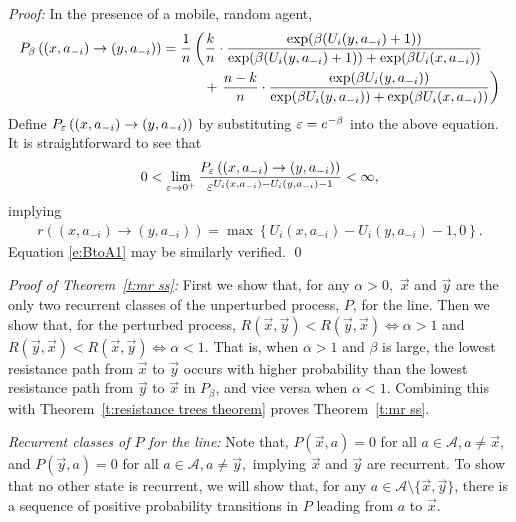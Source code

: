 \noindent\emph{Proof:}
In the presence of a mobile, random agent, %
\begin{align*}
P_\beta \left((x,a_{-i})\to (y,a_{-i})\right) 
&= {1\over n} \left({k\over n}\cdot{\exp( \beta(U_i(y,a_{-i})+1))\over \exp( \beta (U_i(y,a_{-i})+1)) + \exp( \beta U_i(x,a_{-i}))}\right.\\
&\quad\quad\quad + \left.{n-k\over n}\cdot{\exp( \beta U_i(y,a_{-i}))\over \exp( \beta U_i(y,a_{-i})) + \exp( \beta U_i(x,a_{-i}))}\right)
\end{align*}
Define $P_\varepsilon\left((x,a_{-i})\to (y,a_{-i})\right)$ by substituting $\varepsilon = e^{-\beta}$ into the above equation. It is straightforward to see that
\begin{equation*}
0<\lim_{\varepsilon\to 0^+}{P_{\varepsilon} \left((x,a_{-i})\to (y,a_{-i})\right)\over \varepsilon^{  U_i(x,a_{-i}) - U_i(y,a_{-i}) -1 }}<\infty,
\end{equation*}
implying 
\begin{align*}
r((x,a_{-i})\to (y,a_{-i}) )=  \max\left\{U_i(x,a_{-i}) - U_i(y,a_{-i}) -1,0\right\}.
\end{align*}
Equation \eqref{e:BtoA1} may be similarly verified.
\hfill\qed



\noindent\emph{Proof of Theorem~\ref{t:mr ss}: }\label{a:proof mr ss}
First we show that, for any $\alpha >0,$ $\vec{x}$ and $ \vec{y}$ are the only two recurrent classes of the unperturbed process, $P$, for the line. Then we show that, for the perturbed process, 
$R(\vec{x}, \vec{y}) < R( \vec{y},\vec{x}) \iff \alpha >1$ 
and 
$R( \vec{y},\vec{x}) < R(\vec{x}, \vec{y}) \iff \alpha <1.$
That is, when $\alpha >1$ and $\beta$ is large, the lowest resistance path from $\vec{x}$ to $ \vec{y}$ occurs with higher probability than the lowest resistance path from $ \vec{y}$ to $\vec{x}$ in $P_\beta$, and vice versa when $\alpha <1.$ 
 Combining this with Theorem~\ref{t:resistance trees theorem} proves Theorem~\ref{t:mr ss}.

\noindent\emph{Recurrent classes of $P$ for the line:} Note that, 
$P(\vec{x},a) = 0$ for all $a\in \mathcal{A}, a\neq \vec{x},$
and
$P( \vec{y},a) = 0$ for all $a\in \mathcal{A}, a\neq  \vec{y},$
implying $\vec{x}$ and $ \vec{y}$ are recurrent. To show that no other state is recurrent, we will show that, for any $a\in \mathcal{A}\setminus \{\vec{x}, \vec{y}\}$, there is a sequence of positive probability transitions in $P$ leading from $a$ to $\vec{x}$.

